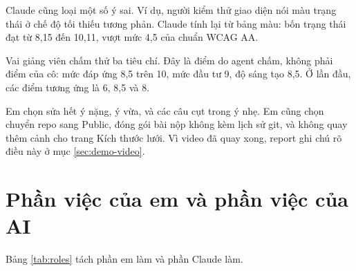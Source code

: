 Claude cũng loại một số ý sai. Ví dụ, người kiểm thử giao diện nói màu trạng thái ở chế độ tối thiếu tương phản. Claude tính lại từ bảng màu: bốn trạng thái đạt từ 8,15 đến 10,11, vượt mức 4,5 của chuẩn WCAG AA.

Vai giảng viên chấm thử ba tiêu chí. Đây là điểm do agent chấm, không phải điểm của cô: mức đáp ứng 8,5 trên 10, mức đầu tư 9, độ sáng tạo 8,5. Ở lần đầu, các điểm tương ứng là 6, 8,5 và 8.

Em chọn sửa hết ý nặng, ý vừa, và các câu cụt trong ý nhẹ. Em cũng chọn chuyển repo sang Public, đóng gói bài nộp không kèm lịch sử git, và không quay thêm cảnh cho trang Kích thước lưới. Vì video đã quay xong, report ghi chú rõ điều này ở mục \ref{sec:demo-video}.

\section{Phần việc của em và phần việc của AI}

Bảng \ref{tab:roles} tách phần em làm và phần Claude làm.

